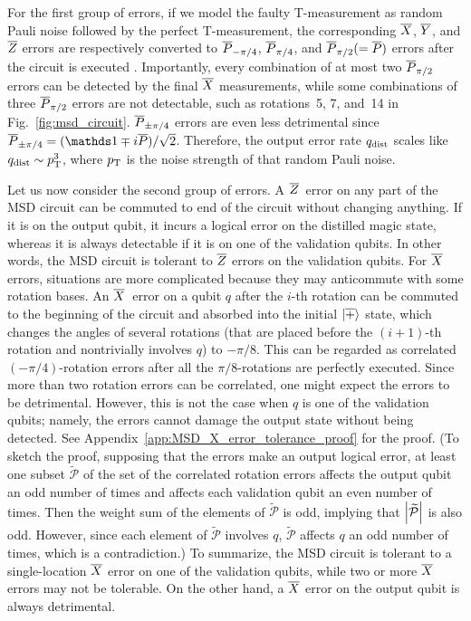 \documentclass[
 prx,
 reprint,
 superscriptaddress,
 longbibliography,
 dvipsnames
]{revtex4-2}
\begin{document}
For the first group of errors, if we model the faulty T-measurement as random Pauli noise followed by the perfect T-measurement, the corresponding $\overline{X}$, $\overline{Y}$, and $\overline{Z}$ errors are respectively converted to $\overline{P}_{-\pi/4}$, $\overline{P}_{\pi/4}$, and $\overline{P}_{\pi/2} (=\overline{P})$ errors after the circuit is executed \cite{litinski2019magic}.
Importantly, every combination of at most two $\overline{P}_{\pi/2}$ errors can be detected by the final $\overline{X}$ measurements, while some combinations of three $\overline{P}_{\pi/2}$ errors are not detectable, such as rotations~5, 7, and~14 in Fig.~\ref{fig:msd_circuit}.
$\overline{P}_{\pm\pi/4}$ errors are even less detrimental since $\rot{\lgc{P}}{\pm\pi/4} = (\identity \mp i\lgc{P})/\sqrt{2}$.
Therefore, the output error rate $q_{\mathrm{dist}}$ scales like $q_{\mathrm{dist}} \sim p_{\mathrm{T}}^3$, where $p_{\mathrm{T}}$ is the noise strength of that random Pauli noise.

Let us now consider the second group of errors.
A $\overline{Z}$~error on any part of the MSD circuit can be commuted to end of the circuit without changing anything.
If it is on the output qubit, it incurs a logical error on the distilled magic state, whereas it is always detectable if it is on one of the validation qubits.
In other words, the MSD circuit is tolerant to $\overline{Z}$ errors on the validation qubits.
For $\overline{X}$ errors, situations are more complicated because they may anticommute with some rotation bases.
An $\overline{X}$~error on a qubit $q$ after the $i$-th rotation can be commuted to the beginning of the circuit and absorbed into the initial $\ket{\overline{+}}$ state, which changes the angles of several rotations (that are placed before the $(i + 1)$-th rotation and nontrivially involves $q$) to $-\pi/8$.
This can be regarded as correlated $(-\pi/4)$-rotation errors after all the $\pi/8$-rotations are perfectly executed.
Since more than two rotation errors can be correlated, one might expect the errors to be detrimental.
However, this is not the case when $q$ is one of the validation qubits; namely, the errors cannot damage the output state without being detected.
See Appendix~\ref{app:MSD_X_error_tolerance_proof} for the proof.
(To sketch the proof, supposing that the errors make an output logical error, at least one subset $\widetilde{\mathcal{P}}$ of the set of the correlated rotation errors affects the output qubit an odd number of times and affects each validation qubit an even number of times.
Then the weight sum of the elements of $\widetilde{\mathcal{P}}$ is odd, implying that $\abs{\widetilde{\mathcal{P}}}$ is also odd.
However, since each element of $\widetilde{\mathcal{P}}$ involves $q$, $\widetilde{\mathcal{P}}$ affects $q$ an odd number of times, which is a contradiction.)
To summarize, the MSD circuit is tolerant to a single-location $\overline{X}$ error on one of the validation qubits, while two or more $\overline{X}$ errors may not be tolerable.
On the other hand, a $\overline{X}$ error on the output qubit is always detrimental.
\end{document}
